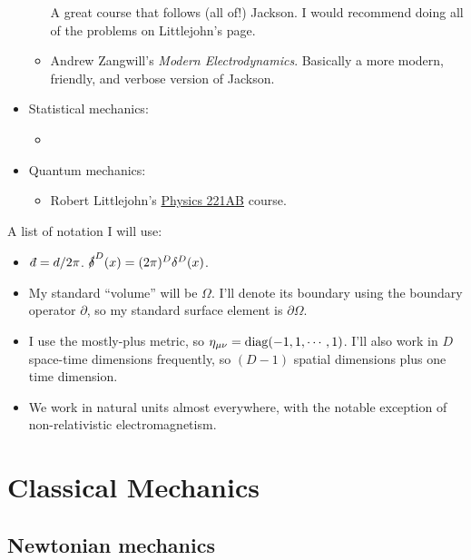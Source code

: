\documentclass[11pt]{article}
\begin{document}
\begin{itemize}
\begin{itemize}
        A great course that follows (all of!) Jackson. I would recommend 
        doing all of the problems on Littlejohn's page.
        \item Andrew Zangwill's \emph{Modern Electrodynamics}. Basically a more 
        modern, friendly, and verbose version of Jackson.
    \end{itemize}
    \item Statistical mechanics:
    \begin{itemize}
        \item {}
    \end{itemize}
    \item Quantum mechanics:
    \begin{itemize}
        \item Robert Littlejohn's \href{https://bohr.physics.berkeley.edu/classes/221/2122/221.html}{Physics 221AB} course.
    \end{itemize}
\end{itemize}

\begin{reemark}
    A list of notation I will use:
    \begin{itemize}
        \item $\dbar = d/2\pi$. $\sl{\delta}^D(x) = (2\pi)^D \delta^D(x)$.
        \item My standard ``volume'' will be $\Omega$. I'll denote its boundary
        using the boundary operator $\partial$, so my standard surface element
        is $\partial \Omega$.
        \item I use the mostly-plus metric, so $\eta_{\mu \nu} = \diag(-1, 1, \cdots, 1)$.
        I'll also work in $D$ space-time dimensions frequently, so $(D - 1)$
        spatial dimensions plus one time dimension.
        \item We work in natural units almost everywhere, with the notable exception
        of non-relativistic electromagnetism.
    \end{itemize}
\end{reemark}

\newpage
\microtoc
\newpage

\section{Classical Mechanics}

\subsection{Newtonian mechanics}
\end{document}
